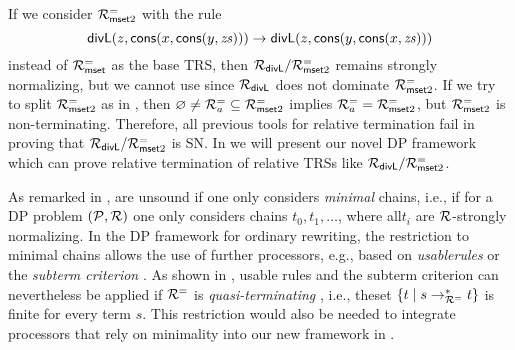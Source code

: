 \begin{example}\label{ex:mainExample}
    If we consider $\mathcal{R}^{=}_{\mathsf{mset} 2}$ with the rule 
    \begin{equation}
        \label{B-com-rule-2} \mathsf{divL}(z,\mathsf{cons}(x, \mathsf{cons}(y,\mathit{zs}))) \to \mathsf{divL}(z,\mathsf{cons}(y, \mathsf{cons}(x,\mathit{zs})))
    \end{equation}
    instead of $\mathcal{R}^{=}_{\mathsf{mset}}$ as the base TRS, then $\mathcal{R}_{\mathsf{divL}} / \mathcal{R}^{=}_{\mathsf{mset} 2}$ remains strongly normalizing,
    but we cannot use  since $\mathcal{R}_{\mathsf{divL}}$ does not
    dominate $\mathcal{R}^{=}_{\mathsf{mset} 2}$. If we try to split $\mathcal{R}^{=}_{\mathsf{mset} 2}$ as in
    , then
    $\varnothing \neq \mathcal{R}^{=}_a \subseteq \mathcal{R}^{=}_{\mathsf{mset} 2}$ implies $\mathcal{R}^{=}_a = \mathcal{R}^{=}_{\mathsf{mset}
    2}$, but
    $\mathcal{R}^{=}_{\mathsf{mset}  2}$ is 
    non-terminating.
    Therefore, all previous tools for relative termination fail in proving that $\mathcal{R}_{\mathsf{divL}} /
    \mathcal{R}^{=}_{\mathsf{mset} 2}$ is SN.
    In  we will present our novel DP framework which can prove
    relative termination of relative TRSs 
    like $\mathcal{R}_{\mathsf{divL}} / \mathcal{R}^{=}_{\mathsf{mset} 2}$.
\end{example}

As remarked in \cite{iborra2017relative},
are unsound if one only considers \emph{minimal} chains, i.e., if
for a DP problem $(\mathcal{P},\mathcal{R})$ one only considers 
chains $t_0, t_1, \ldots$, where all\linebreak $t_i$ are $\mathcal{R}$-strongly normalizing.
In the DP framework for ordinary rewriting,
the re\-striction to minimal chains allows the use of further processors, e.g., based on
\emph{usable}\linebreak \emph{rules} \cite{giesl2006mechanizing,DBLP:journals/iandc/HirokawaM07} or the \emph{subterm criterion} \cite{DBLP:journals/iandc/HirokawaM07}.
As shown in \cite{iborra2017relative}, usable rules and the subterm
criterion can nevertheless be 
applied if $\mathcal{R}^{=}$ is \emph{quasi-terminating} \cite{dershowitz_termination_1987}, 
i.e., the\linebreak set $\{t \mid s \to_{\mathcal{R}^{=}}^* t \}$ is finite for every term $s$.
This restriction would also be needed to integrate processors that rely on
minimality
into our new framework in .

